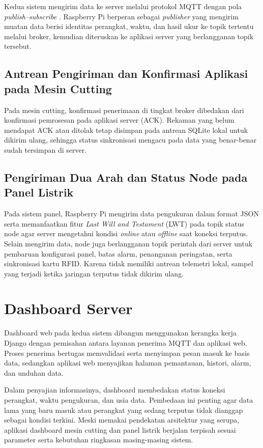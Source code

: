 Kedua sistem mengirim data ke server melalui protokol MQTT dengan pola \textit{publish--subscribe} \citep{mqtt2014}. Raspberry Pi berperan sebagai \textit{publisher} yang mengirim muatan data berisi identitas perangkat, waktu, dan hasil ukur ke topik tertentu melalui broker, kemudian diteruskan ke aplikasi server yang berlangganan topik tersebut.

\subsection{Antrean Pengiriman dan Konfirmasi Aplikasi pada Mesin Cutting}

Pada mesin cutting, konfirmasi penerimaan di tingkat broker dibedakan dari konfirmasi pemrosesan pada aplikasi server (ACK). Rekaman yang belum mendapat ACK atau ditolak tetap disimpan pada antrean SQLite lokal untuk dikirim ulang, sehingga status sinkronisasi mengacu pada data yang benar-benar sudah tersimpan di server.

\subsection{Pengiriman Dua Arah dan Status Node pada Panel Listrik}

Pada sistem panel, Raspberry Pi mengirim data pengukuran dalam format JSON serta memanfaatkan fitur \textit{Last Will and Testament} (LWT) pada topik status node agar server mengetahui kondisi \textit{online} atau \textit{offline} saat koneksi terputus. Selain mengirim data, node juga berlangganan topik perintah dari server untuk pembaruan konfigurasi panel, batas alarm, penanganan peringatan, serta sinkronisasi kartu RFID. Karena tidak memiliki antrean telemetri lokal, sampel yang terjadi ketika jaringan terputus tidak dikirim ulang.

\section{Dashboard Server}

Dashboard web pada kedua sistem dibangun menggunakan kerangka kerja Django \citep{django} dengan pemisahan antara layanan penerima MQTT dan aplikasi web. Proses penerima bertugas memvalidasi serta menyimpan pesan masuk ke basis data, sedangkan aplikasi web menyajikan halaman pemantauan, histori, alarm, dan unduhan data.

Dalam penyajian informasinya, dashboard membedakan status koneksi perangkat, waktu pengukuran, dan usia data. Pembedaan ini penting agar data lama yang baru masuk atau perangkat yang sedang terputus tidak dianggap sebagai kondisi terkini. Meski memakai pendekatan arsitektur yang serupa, aplikasi dashboard mesin cutting dan panel listrik berjalan terpisah sesuai parameter serta kebutuhan ringkasan masing-masing sistem.

